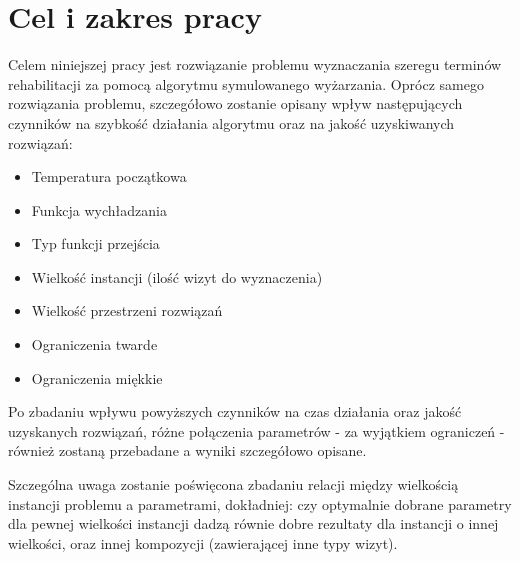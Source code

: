 \chapter{Cel i zakres pracy} Celem niniejszej pracy jest rozwiązanie problemu
wyznaczania szeregu terminów rehabilitacji za pomocą algorytmu symulowanego
wyżarzania. Oprócz samego rozwiązania problemu, szczegółowo zostanie opisany
wpływ następujących czynników na szybkość działania algorytmu oraz na jakość
uzyskiwanych rozwiązań:

\begin{itemize} \item Temperatura początkowa \item Funkcja wychładzania \item
	Typ funkcji przejścia \item Wielkość instancji (ilość wizyt do
	wyznaczenia) \item Wielkość przestrzeni rozwiązań \item Ograniczenia
	twarde \item Ograniczenia miękkie \end{itemize} Po zbadaniu wpływu
	powyższych czynników na czas działania oraz jakość uzyskanych rozwiązań,
	różne połączenia parametrów - za wyjątkiem ograniczeń - również zostaną
	przebadane a wyniki szczegółowo opisane.

Szczególna uwaga zostanie poświęcona zbadaniu relacji między wielkością
instancji problemu a parametrami, dokładniej: czy optymalnie dobrane parametry
dla pewnej wielkości instancji dadzą równie dobre rezultaty dla instancji o
innej wielkości, oraz innej kompozycji (zawierającej inne typy wizyt).

